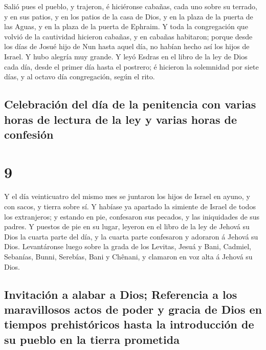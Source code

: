  Salió pues el pueblo, y trajeron, é hiciéronse cabañas,
cada uno sobre su terrado, y en sus patios, y en los patios de la casa
de Dios, y en la plaza de la puerta de las Aguas, y en la plaza de la
puerta de Ephraim.  Y toda la congregación que volvió de
la cautividad hicieron cabañas, y en cabañas habitaron; porque desde los
días de Josué hijo de Nun hasta aquel día, no habían hecho así los hijos
de Israel. Y hubo alegría muy grande.  Y leyó Esdras en
el libro de la ley de Dios cada día, desde el primer día hasta el
postrero; é hicieron la solemnidad por siete días, y al octavo día
congregación, según el rito.

\hypertarget{celebraciuxf3n-del-duxeda-de-la-penitencia-con-varias-horas-de-lectura-de-la-ley-y-varias-horas-de-confesiuxf3n}{%
\subsection{Celebración del día de la penitencia con varias horas de
lectura de la ley y varias horas de
confesión}\label{celebraciuxf3n-del-duxeda-de-la-penitencia-con-varias-horas-de-lectura-de-la-ley-y-varias-horas-de-confesiuxf3n}}

\hypertarget{section-8}{%
\section{9}\label{section-8}}

 Y el día veinticuatro del mismo mes se juntaron los hijos
de Israel en ayuno, y con sacos, y tierra sobre sí.  Y
habíase ya apartado la simiente de Israel de todos los extranjeros; y
estando en pie, confesaron sus pecados, y las iniquidades de sus padres.
 Y puestos de pie en su lugar, leyeron en el libro de la
ley de Jehová su Dios la cuarta parte del día, y la cuarta parte
confesaron y adoraron á Jehová su Dios.  Levantáronse
luego sobre la grada de los Levitas, Jesuá y Bani, Cadmiel, Sebanías,
Bunni, Serebías, Bani y Chênani, y clamaron en voz alta á Jehová su
Dios.

\hypertarget{invitaciuxf3n-a-alabar-a-dios-referencia-a-los-maravillosos-actos-de-poder-y-gracia-de-dios-en-tiempos-prehistuxf3ricos-hasta-la-introducciuxf3n-de-su-pueblo-en-la-tierra-prometida}{%
\subsection{Invitación a alabar a Dios; Referencia a los maravillosos
actos de poder y gracia de Dios en tiempos prehistóricos hasta la
introducción de su pueblo en la tierra
prometida}\label{invitaciuxf3n-a-alabar-a-dios-referencia-a-los-maravillosos-actos-de-poder-y-gracia-de-dios-en-tiempos-prehistuxf3ricos-hasta-la-introducciuxf3n-de-su-pueblo-en-la-tierra-prometida}}

